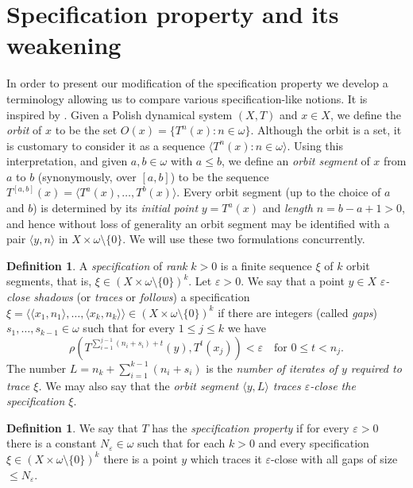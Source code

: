 \documentclass{amsart}
\theoremstyle{definition}
\newtheorem{defn}[thm]{Definition}
\newcommand{\eps}{\varepsilon}
\begin{document}
\section{Specification property and its weakening} \label{sec:spec}
In order to present our modification of the specification property we develop a terminology allowing us to compare various specification-like notions. It is inspired by \cite{KLO}.
Given a Polish dynamical system $(X,T)$ and $x\in X$, we define the \emph{orbit} of $x$ to be the set $O(x)=\{T^n(x):n\in\omega\}$.
Although the orbit is a set, it is customary to consider it as a sequence
$\langle T^n(x):n\in\omega\rangle$. Using this interpretation, and given $a,b\in\omega$ with $a\le b$, we define an \emph{orbit segment} of $x$ from $a$ to $b$ (synonymously, over $[a,b]$) to be the sequence $T^{[a,b]}(x)=\langle
T^a(x),\ldots,T^b(x)\rangle$. Every orbit segment (up to the choice of
$a$ and $b$) is determined by its \emph{initial point} $y=T^a(x)$ and
\emph{length} $n=b-a+1>0$, and hence without loss of generality an orbit segment may
be identified with a pair $\langle y,n\rangle$ in $X\times\omega\setminus\{0\}$. We will use these two formulations concurrently.
\begin{defn}
A  \emph{specification} of \emph{rank} $k>0$ is a finite sequence $\xi$ of $k$
orbit segments, that is, $\xi\in(X\times \omega\setminus\{0\})^k$. Let $\eps>0$. We say
that a point $y\in X$ \emph{$\eps$-close shadows} (or \emph{traces} or
\emph{follows})  a specification $\xi=\langle\langle
x_1,n_1\rangle,\ldots,\langle x_k,n_k\rangle\rangle\in(X\times\omega\setminus\{0\})^k$
if there are integers (called \emph{gaps}) $s_1,\ldots,s_{k-1}\in\omega$ such that
for every $1\le j\le k$ we have
\[
\rho( T^{\sum_{i=1}^{j-1} (n_i+s_i)+t}(y),T^t(x_j))<\eps\quad\text{for }0\le t<n_j.
\]
The number  $L=n_k+\sum_{i=1}^{k-1} (n_i+s_i)$ is the
\emph{number of iterates of $y$ required to trace $\xi$.} We may also say that
the \emph{orbit segment $\langle y,L\rangle$ traces $\eps$-close the specification $\xi$}.
\end{defn}

\begin{defn}
We say that $T$ has the \emph{specification property} if for every
$\eps>0$ there is a constant $N_\eps\in\omega$ such that for each $k>0$
and every specification $\xi\in(X\times\omega\setminus\{0\})^k$ there is a point $y$ which
traces it $\eps$-close with all gaps of size $\leq N_\eps$.
\end{defn}
\end{document}
